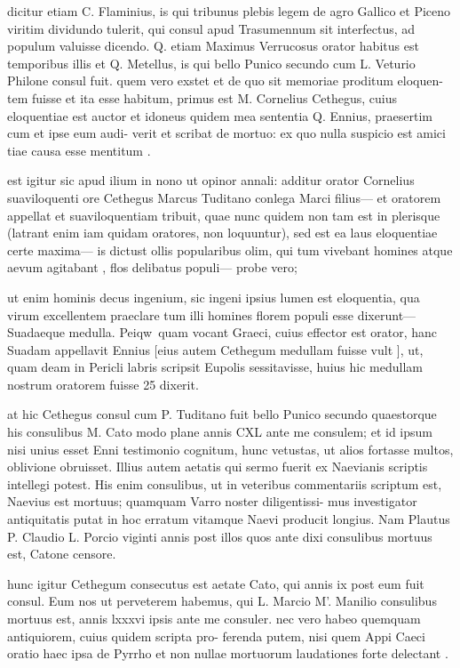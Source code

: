  dicitur etiam C. Flaminius, is qui tribunus plebis legem de agro Gallico et Piceno viritim dividundo tulerit, qui consul apud Trasumennum sit interfectus, ad populum valuisse dicendo. Q. etiam Maximus Verrucosus orator habitus est temporibus illis et Q. Metellus, is qui bello Punico secundo cum L. Veturio Philone consul fuit. quem vero exstet et de quo sit memoriae proditum eloquen- tem fuisse et ita esse habitum, primus est M. Cornelius Cethegus, cuius eloquentiae est auctor et idoneus quidem mea sententia Q. Ennius, praesertim cum et ipse eum audi- verit et scribat de mortuo: ex quo nulla suspicio est amici tiae causa esse mentitum .

 est igitur sic apud ilium in nono ut opinor annali: additur orator Cornelius suaviloquenti ore Cethegus Marcus Tuditano conlega Marci filius— et oratorem appellat et suaviloquentiam tribuit, quae nunc quidem non tam est in plerisque (latrant enim iam quidam oratores, non loquuntur), sed est ea laus eloquentiae certe maxima— is dictust ollis popularibus olim, qui tum vivebant homines atque aevum agitabant , flos delibatus populi— probe vero;

 ut enim hominis decus ingenium, sic ingeni ipsius lumen est eloquentia, qua virum excellentem praeclare tum illi homines florem populi esse dixerunt— Suadaeque medulla. Peiqw\ quam vocant Graeci, cuius effector est orator, hanc Suadam appellavit Ennius [eius autem Cethegum medullam fuisse vult ], ut, quam deam in Pericli labris scripsit Eupolis sessitavisse, huius hic medullam nostrum oratorem fuisse 25 dixerit.

 at hic Cethegus consul cum P. Tuditano fuit bello Punico secundo quaestorque his consulibus M. Cato modo plane annis CXL ante me consulem; et id ipsum nisi unius esset Enni testimonio cognitum, hunc vetustas, ut alios fortasse multos, oblivione obruisset. Illius autem aetatis qui sermo fuerit ex Naevianis scriptis intellegi potest. His enim consulibus, ut in veteribus commentariis scriptum est, Naevius est mortuus; quamquam Varro noster diligentissi- mus investigator antiquitatis putat in hoc erratum vitamque Naevi producit longius. Nam Plautus P. Claudio L. Porcio viginti annis post illos quos ante dixi consulibus mortuus est, Catone censore.

 hunc igitur Cethegum consecutus est aetate Cato, qui annis ix post eum fuit consul. Eum nos ut perveterem habemus, qui L. Marcio M'. Manilio consulibus mortuus est, annis lxxxvi ipsis ante me consuler. nec vero habeo quemquam antiquiorem, cuius quidem scripta pro- ferenda putem, nisi quem Appi Caeci oratio haec ipsa de Pyrrho et non nullae mortuorum laudationes forte delectant .

